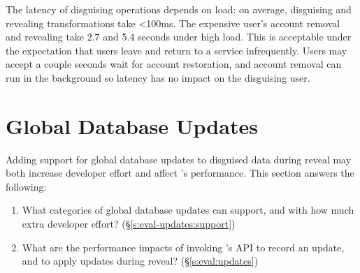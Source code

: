 %
%
%

The latency of disguising operations depends on load: on average, disguising and
revealing transformations take <100ms.  The expensive user's account removal and
revealing take 2.7 and 5.4 seconds under high load. 
%
%
%
This is acceptable under the expectation that users leave and return to a
service infrequently. Users may accept a couple seconds wait for account
restoration, and account removal can run in the background so latency has no
impact on the disguising user.  

\section{Global Database Updates}
\label{s:eval-updates}

%
Adding support for global database updates to disguised data during reveal may both
increase developer effort and affect \sys's performance.
This section answers the following:
\begin{enumerate}[nosep]
    \item What categories of global database updates can \sys support, and with how
        much extra developer effort? (\S\ref{s:eval-updates:support})
    \item What are the performance impacts of invoking \sys's API to record an
        update, and to apply updates during reveal? (\S\ref{s:eval:updates})
\end{enumerate}

